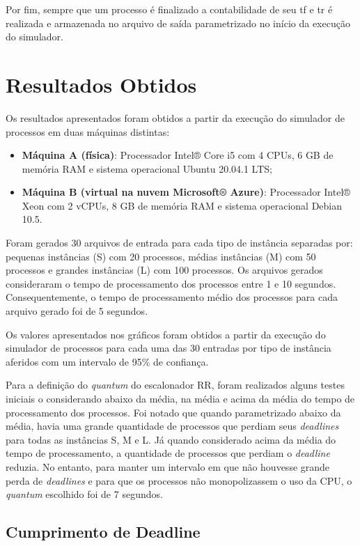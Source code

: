 \documentclass[12pt]{article}
\begin{document}
Por fim, sempre que um processo é finalizado a contabilidade de seu tf e tr é realizada e armazenada no arquivo de saída parametrizado no início da execução do simulador.

\section{Resultados Obtidos}

Os resultados apresentados foram obtidos a partir da execução do simulador de processos em duas máquinas distintas:
\begin{itemize}
	\item \textbf{Máquina A (física)}: Processador Intel® Core i5 com 4 CPUs, 6 GB de memória RAM e sistema operacional Ubuntu 20.04.1 LTS;
	\item \textbf{Máquina B (virtual na nuvem Microsoft® Azure)}: Processador Intel® Xeon com 2 vCPUs, 8 GB de memória RAM e sistema operacional Debian 10.5.
\end{itemize}

Foram gerados 30 arquivos de entrada para cada tipo de instância separadas por: pequenas instâncias (S) com 20 processos, médias instâncias (M) com 50 processos e grandes instâncias (L) com 100 processos. Os arquivos gerados consideraram o tempo de processamento dos processos entre 1 e 10 segundos. Consequentemente, o tempo de processamento médio dos processos para cada arquivo gerado foi de 5 segundos.

Os valores apresentados nos gráficos foram obtidos a partir da execução do simulador de processos para cada uma das 30 entradas por tipo de instância aferidos com um intervalo de 95\% de confiança.

Para a definição do \textit{quantum} do escalonador RR, foram realizados alguns testes iniciais o considerando abaixo da média, na média e acima da média do tempo de processamento dos processos. Foi notado que quando parametrizado abaixo da média, havia uma grande quantidade de processos que perdiam seus \textit{deadlines} para todas as instâncias S, M e L. Já quando considerado acima da média do tempo de processamento, a quantidade de processos que perdiam o \textit{deadline} reduzia. No entanto, para manter um intervalo em que não houvesse grande perda de \textit{deadlines} e para que os processos não monopolizassem o uso da CPU, o \textit{quantum} escolhido foi de 7 segundos.


\subsection{Cumprimento de Deadline}
\end{document}
